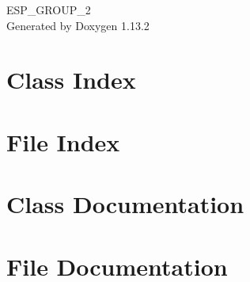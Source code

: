 \documentclass[twoside]{book}
\newcommand{\+}{\discretionary{\mbox{\scriptsize$\hookleftarrow$}}{}{}}
\newcommand{\clearemptydoublepage}{%
    \newpage{\pagestyle{empty}\cleardoublepage}%
  }
\begin{document}
  \raggedbottom
    \hypersetup{pageanchor=false,
                bookmarksnumbered=true,
                pdfencoding=unicode
               }
  \begin{titlepage}
  \vspace*{7cm}
  \begin{center}%
  {\Large ESP\+\_\+\+GROUP\+\_\+2}\\
  \vspace*{1cm}
  {\large Generated by Doxygen 1.13.2}\\
  \end{center}
  \end{titlepage}
  \clearemptydoublepage
  \tableofcontents
  \clearemptydoublepage
  \hypersetup{pageanchor=true}
\chapter{Class Index}

\chapter{File Index}

\chapter{Class Documentation}











\chapter{File Documentation}


































  \backmatter
  \newpage
  \clearemptydoublepage
  \printindex
\end{document}
